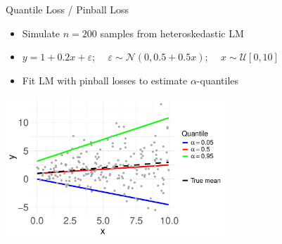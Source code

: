 \documentclass[11pt,compress,t,notes=noshow, xcolor=table]{beamer}
\begin{document}
\begin{vbframe}{Quantile Loss / Pinball Loss}
  
\begin{itemize}

\item Simulate $n=200$ samples from heteroskedastic LM 
\item $y = 1+0.2x+\varepsilon$; 
$\quad \varepsilon \sim \mathcal{N}(0, 0.5+0.5x)$; $\quad x \sim \mathcal{U}[0,10]$
\item Fit LM with pinball losses to estimate $\alpha$-quantiles 

\end{itemize}

\vspace{-0.2cm}

\begin{center}
\includegraphics[width = 0.62\textwidth]{figure/quantile-regression.pdf}
\end{center}

\end{vbframe}




\endlecture
\end{document}
